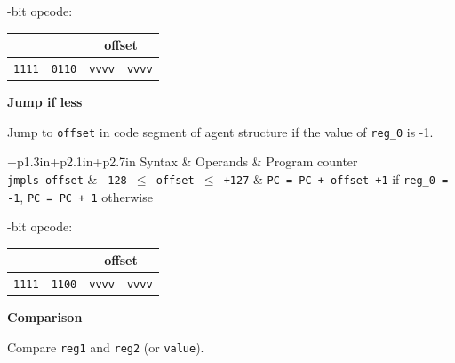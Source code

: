 \documentclass{scrreprt}
\begin{document}
-bit opcode:

\noindent
\begin{tabular}{|c|c|c|c|}
 \multicolumn{2}{|c|}{} & \multicolumn{2}{c|}{offset}\\
\hline
\texttt{1111} & \texttt{0110} & \texttt{vvvv} & \texttt{vvvv}\\

\end{tabular}


\vspace{0.4in}
\noindent
\textbf{Jump if less}

\noindent
Jump to \texttt{offset} in code segment of agent structure if the value of \texttt{reg_0} is -1.

\noindent
{}

\vspace{0.1in}

\noindent
\begin{tabular}{+p{1.3in}+p{2.1in}+p{2.7in}}
Syntax  		  & Operands   								     & Program counter       \\

\texttt{jmpls  offset} & \texttt{-128 $\leq$ offset $\leq$ +127} & \texttt{PC = PC + offset +1} if \texttt{reg_0 = -1}, \texttt{PC = PC + 1} otherwise \\

\end{tabular}

-bit opcode:

\noindent
\begin{tabular}{|c|c|c|c|}
 \multicolumn{2}{|c|}{} & \multicolumn{2}{c|}{offset}\\
\hline
\texttt{1111} & \texttt{1100} & \texttt{vvvv} & \texttt{vvvv}\\

\end{tabular}

\vspace{0.4in}
\noindent
\textbf{Comparison}

\noindent
Compare \texttt{reg1} and \texttt{reg2} (or \texttt{value}).




\noindent
{}
\end{document}
